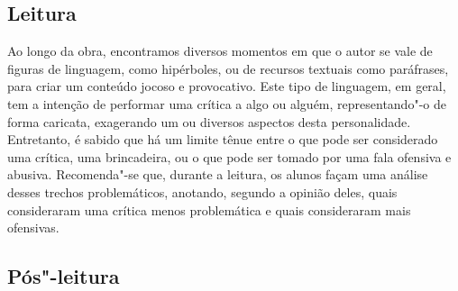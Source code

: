 \documentclass[12pt]{extarticle}
\begin{document}
\subsection{Leitura}



Ao longo da obra, encontramos diversos momentos em que o
autor se vale de figuras de linguagem, como hipérboles, ou de recursos
textuais como paráfrases, para criar um conteúdo jocoso e provocativo.
Este tipo de linguagem, em geral, tem a intenção de performar uma
crítica a algo ou alguém, representando"-o de forma caricata, exagerando
um ou diversos aspectos desta personalidade. Entretanto, é sabido que há
um limite tênue entre o que pode ser considerado uma crítica, uma
brincadeira, ou o que pode ser tomado por uma fala ofensiva e abusiva.
Recomenda"-se que, durante a leitura, os alunos façam uma análise desses
trechos problemáticos, anotando, segundo a opinião deles, quais
consideraram uma crítica menos problemática e quais consideraram mais
ofensivas.

\subsection{Pós"-leitura}
\end{document}
